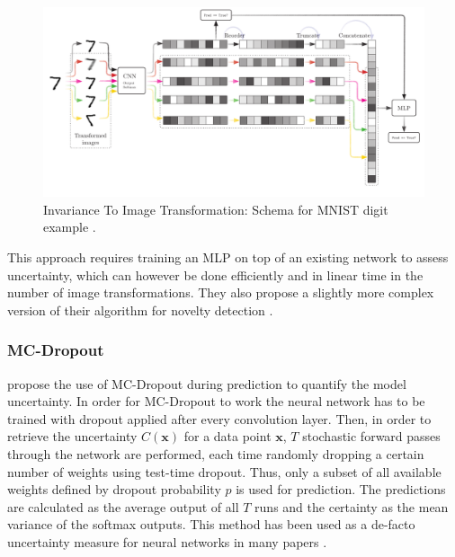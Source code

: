 \documentclass[10pt]{article}
\begin{document}
\begin{figure}[H]
    \centering
    \includegraphics[width=\textwidth]{Schema/schema_baseline_1}
    \caption{Invariance To Image Transformation: Schema for \gls{MNIST} digit example \cite{Bahat_2018}.}
    \label{fig:schema-baseline1}
\end{figure}

This approach requires training an \gls{MLP} on top of an existing network to assess uncertainty, which can however be done efficiently and in linear time in the number of image transformations. They also propose a slightly more complex version of their algorithm for novelty detection \cite{Bahat_2018}.

\subsubsection{MC-Dropout}
\textcite{ghahramani} propose the use of \gls{MC-Dropout} during prediction to quantify the model uncertainty. In order for \gls{MC-Dropout} to work the neural network has to be trained with dropout applied after every convolution layer. Then, in order to retrieve the uncertainty $C(\mathbf{x})$ for a data point $\mathbf{x}$,  $T$ stochastic forward passes through the network are performed, each time randomly dropping a certain number of weights using test-time dropout. Thus, only a subset of all available weights defined by dropout probability $p$ is used for prediction. The predictions are calculated as the average output of all $T$ runs and the certainty as the mean variance of the softmax outputs. This method has been used as a de-facto uncertainty measure for neural networks in many papers \cite{mandelbaum17, leibig2017, Lakshminarayanan16, subramanya, Kampffmeyer2016SemanticSO}.
\end{document}
